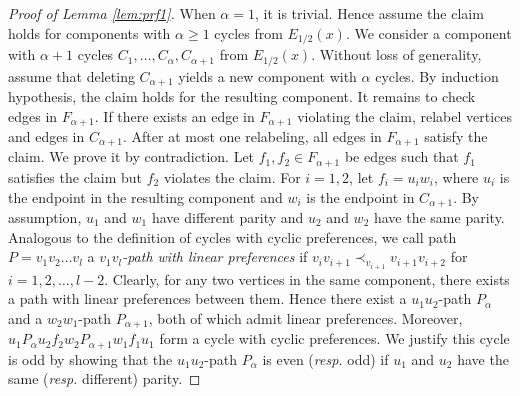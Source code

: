 \documentclass[11pt]{article}
\numberwithin{theorem}{section}
\begin{document}
\begin{proof}[Proof of Lemma \ref{lem:prf1}]
When $\alpha=1$, it is trivial.
Hence assume the claim holds for components with $\alpha\geq 1$ cycles from $E_{1/2}(x)$. We consider a component with $\alpha +1$ cycles $C_1, \ldots, C_{\alpha}, C_{\alpha+1}$ from $E_{1/2}(x)$.
Without loss of generality, assume that deleting $C_{\alpha+1}$ yields a new component with $\alpha$ cycles.
By induction hypothesis, the claim holds for the resulting component.
It remains to check edges in $F_{\alpha+1}$. If there exists an edge in $F_{\alpha+1}$ violating the claim, relabel vertices and edges in $C_{\alpha+1}$. After at most one relabeling, all edges in $F_{\alpha+1}$ satisfy the claim. We prove it by contradiction. Let $f_1,f_2 \in F_{\alpha +1}$ be edges such that $f_1$ satisfies the claim but $f_2$ violates the claim. For $i=1,2$, let $f_i=u_i w_i$, where $u_i$ is the endpoint in the resulting component and $w_i$ is the endpoint in $C_{\alpha+1}$. By assumption, $u_1$ and $w_1$ have different parity and $u_2$ and $w_2$ have the same parity.
Analogous to the definition of cycles with cyclic preferences, we call path $P=v_1 v_2 \ldots v_l$ a \textit{$v_1 v_l$-path with linear preferences} if $v_iv_{i+1}\prec_{v_{i+1}}v_{i+1}v_{i+2}$ for $i=1,2,\ldots,l-2$. Clearly, for any two vertices in the same component, there exists a path with linear preferences between them.
Hence there exist a $u_1 u_2$-path $P_\alpha$ and a $w_2 w_1$-path $P_{\alpha+1}$, both of which admit linear preferences.
Moreover, $u_1 P_\alpha u_2 f_2 w_2 P_{\alpha+1} w_1 f_1 u_1$ form a cycle with cyclic preferences. We justify this cycle is odd by
showing that the $u_1 u_2$-path $P_\alpha$ is even (\textit{resp.} odd) if $u_1$ and $u_2$ have the same (\textit{resp.} different) parity.


\end{proof}
\end{document}
